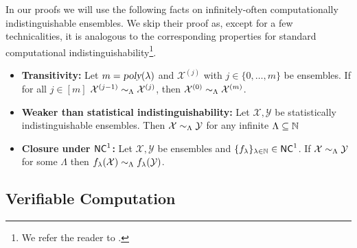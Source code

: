 In our proofs we will use the following facts on infinitely-often computationally indistinguishable ensembles. We skip their proof as, except for a few technicalities, it is analogous to the corresponding properties for standard computational indistinguishability\footnote{We refer the reader to \cite{goldreich2009foundations1}.}.

\begin{lemma}
\label{lemma:hyb-arg}
\label{lemma:facts-lind}
\begin{itemize}
\item \textbf{Transitivity:}
Let $m = {\textsl{poly}}(\lambda)$ and $\mathcal{X}^{(j)}$ with $j \in \{0,\dots,m \} $ be ensembles.
If for all $j \in [m]$ $\mathcal{X}^{(j-1)} \sim_{\Lambda} \mathcal{X}^{(j)}$, then $\mathcal{X}^{(0)} \sim_{\Lambda} \mathcal{X}^{(m)}$.
\item \textbf{Weaker than statistical indistinguishability:} Let $\mathcal{X}, \mathcal{Y}$ be statistically indistinguishable ensembles. Then $\mathcal{X} \sim_{\Lambda} \mathcal{Y}$ for any infinite $\Lambda \subseteq \mathbb{N}$
\item \textbf{Closure under ${\mathsf{NC}}^1$:}  Let $\mathcal{X}, \mathcal{Y}$ be ensembles and $\{f_{\lambda}\}_{\lambda\in\mathbb{N}} \in {\ensuremath{\mathsf{NC}}}^1$. If $\mathcal{X} \sim_{\Lambda} \mathcal{Y}$ for some $\Lambda$ then 
$f_{\lambda}(\mathcal{X}) \sim_{\Lambda} f_{\lambda}(\mathcal{Y})$.
\end{itemize}
\end{lemma}







\subsection{Verifiable Computation}



